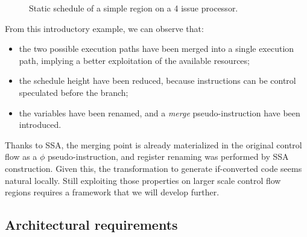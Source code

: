 \begin{figure}
\caption{Static schedule of a simple region on a 4 issue processor. }
\label{fig:example1}
\end{figure}


From this introductory example, we can observe that:
\begin{itemize}
\item the two possible execution paths have been merged into a single execution path, implying a  better exploitation of the available resources;  
\item the schedule height have been reduced, because instructions can be control speculated before the branch;
\item the variables have been renamed, and a \textit{merge} pseudo-instruction have been introduced.
\end{itemize}

Thanks to SSA, the merging point is already materialized in the original control flow as a $\phi$ pseudo-instruction, and register renaming was performed by SSA construction. Given this, the transformation to generate if-converted code seems natural locally. Still exploiting those properties on larger scale control flow regions requires a framework that we will develop further.

\subsection{Architectural requirements}

